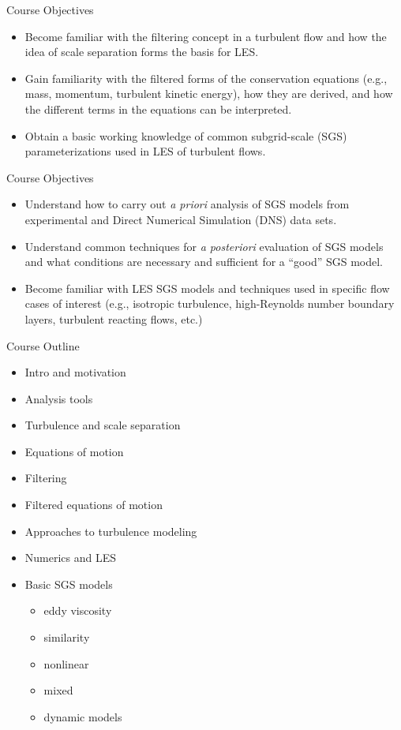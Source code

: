 \begin{frame}{Course Objectives}
\begin{itemize}
\item Become familiar with the filtering concept in a turbulent flow and how the idea of scale separation forms the basis for LES.
\item Gain familiarity with the filtered forms of the conservation equations (e.g., mass, momentum, turbulent kinetic energy), how they are derived, and how the different terms in the equations can be interpreted.
\item Obtain a basic working knowledge of common subgrid-scale (SGS) parameterizations used in LES of turbulent flows.
\end{itemize}
\end{frame}


\begin{frame}{Course Objectives}
\begin{itemize}
\item Understand how to carry out \textit{a priori} analysis of SGS models from experimental and Direct Numerical Simulation (DNS) data sets.
\item Understand common techniques for \textit{a posteriori} evaluation of SGS models and what conditions are necessary and sufficient for a ``good'' SGS model.
\item Become familiar with LES SGS models and techniques used in specific flow cases of interest (e.g., isotropic turbulence, high-Reynolds number boundary layers,  turbulent reacting flows, etc.)
\end{itemize}
\end{frame}


\begin{frame}{Course Outline}
\begin{itemize}
\item Intro and motivation
\item Analysis tools
\item Turbulence and scale separation
\item Equations of motion
\item Filtering
\item Filtered equations of motion
\item Approaches to turbulence modeling
\item Numerics and LES
\item Basic SGS models
\begin{itemize}
\item eddy viscosity
\item similarity
\item nonlinear
\item mixed
\item dynamic models
\end{itemize}
\end{itemize}
\end{frame}


